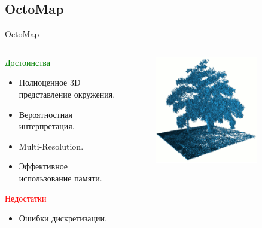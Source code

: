 \documentclass[9pt]{beamer}
\begin{document}
\subsection{OctoMap}

\begin{frame}{OctoMap}
  \begin{columns}
    \begin{column}{0.50\textwidth}
        \begin{block}{\textcolor{green}{Достоинства}}
          \begin{itemize}
          \item
          { 
            Полноценное 3D представление окружения.
          }
          \item
          { 
            Вероятностная интерпретация.
          }
          \item
          { 
            Multi-Resolution.
          }
          \item
          { 
            Эффективное использование памяти.
          }
          \end{itemize}
        \end{block}

        \begin{block}{\textcolor{red}{Недостатки}}
          \begin{itemize}
          \item
          {
            Ошибки дискретизации.
          }
          \end{itemize}
        \end{block}
    \end{column}
    \begin{column}{0.40\textwidth}
        \begin{figure}[h]
          \centering
          \includegraphics[width=0.8\textwidth]{octomap_tree.png}
        \end{figure}
    \end{column}
  \end{columns}  
\end{frame}
\end{document}
